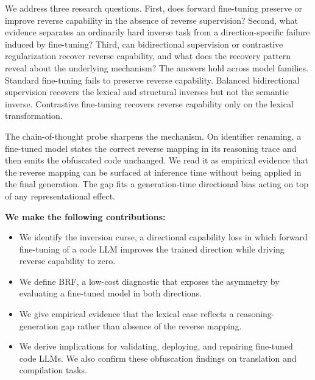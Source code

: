 We address three research questions. First, does forward fine-tuning preserve or
improve reverse capability in the absence of reverse supervision? Second, what
evidence separates an ordinarily hard inverse task from a direction-specific
failure induced by fine-tuning? Third, can bidirectional supervision or
contrastive regularization recover reverse capability, and what does the recovery
pattern reveal about the underlying mechanism? The answers hold across model
families. Standard fine-tuning fails to preserve reverse capability. Balanced
bidirectional supervision recovers the lexical and structural inverses but not
the semantic inverse. Contrastive fine-tuning recovers reverse capability only on
the lexical transformation.

The chain-of-thought probe sharpens the mechanism. On identifier renaming, a
fine-tuned model states the correct reverse mapping in its reasoning trace and
then emits the obfuscated code unchanged. %
We read it as empirical evidence that the reverse
mapping can be surfaced at inference time without being applied in the final
generation. The gap fits a generation-time directional bias acting on top of any
representational effect.

\noindent\textbf{We make the following contributions:}
\begin{itemize}[leftmargin=*,topsep=0pt]
    \item[\wcircle{1}] We identify the inversion curse, a directional capability loss in which forward fine-tuning of a code LLM improves the trained direction while driving reverse capability to zero.
    \item[\wcircle{2}] We define BRF, a low-cost diagnostic that exposes the
    asymmetry by evaluating a fine-tuned model in both directions.
    \item[\wcircle{3}] We give empirical evidence that the lexical case reflects
    a reasoning-generation gap rather than absence of the reverse mapping.
    \item[\wcircle{4}] We derive implications for validating, deploying, and
    repairing fine-tuned code LLMs. We also confirm these obfuscation findings on translation and compilation tasks.
\end{itemize}

